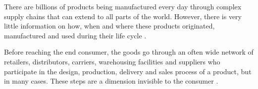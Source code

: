 There are billions of products being manufactured every day through complex supply chains that can extend to all parts of the world. However, there is very little information on how, when and where these products originated, manufactured and used during their life cycle \cite{horiuchirastreabilidade}.

Before reaching the end consumer, the goods go through an often wide network of retailers, distributors, carriers, warehousing facilities and suppliers who participate in the design, production, delivery and sales process of a product, but in many cases. These steps are a dimension invisible to the consumer \cite{provenance2015}.